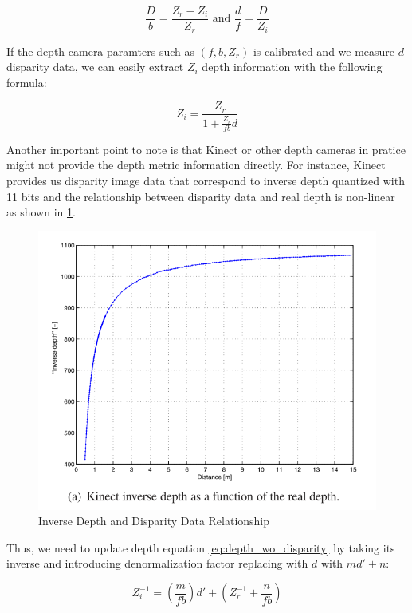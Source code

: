 \documentclass[a4paper]{report}
\numberwithin{figure}{section}
\begin{document}
\begin{equation}
  \frac{D}{b} = \frac{Z_r - Z_i}{Z_r} \text{ and } \frac{d}{f} = \frac{D}{Z_i}
\end{equation}

If the depth camera paramters such as $(f, b, Z_r)$ is 
calibrated and we measure $d$ disparity data, 
we can easily extract $Z_i$ depth information with the following formula:

\begin{equation}
  Z_i = \frac{Z_r}{1+\frac{Z_r}{fb}d}
\end{equation}\label{eq:depth_wo_disparity}

Another important point to note is that Kinect or other depth cameras in pratice might 
not provide the depth metric information directly. For instance, 
Kinect provides us disparity image data that correspond to inverse depth 
quantized with 11 bits and the relationship between disparity data and 
real depth is non-linear as shown in \ref{fig:depth_disparity_relation}.

\begin{figure}[H]
	\centering
  \includegraphics[width=0.7\linewidth,natwidth=640,natheight=640]
  {fig/ref_imgs/depth_disparity_relation.png}
  \caption{Inverse Depth and Disparity Data Relationship}
	\label{fig:depth_disparity_relation}
\end{figure}

Thus, we need to update depth equation \ref{eq:depth_wo_disparity} by 
taking its inverse and 
introducing denormalization factor replacing with $d$ with $md'+n$:

\begin{equation}
  Z_i^{-1} = (\frac{m}{fb})d' + (Z_r^{-1} + \frac{n}{fb})
\end{equation}
\end{document}
